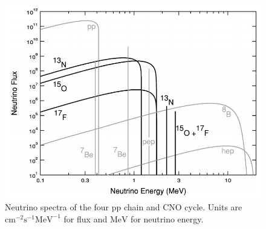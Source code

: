 \documentclass[%
 aip,
 jmp,%
 amsmath,amssymb,
 reprint,%
]{revtex4-1}
\begin{document}
\begin{figure}[!hbtp]
\centering
\includegraphics[width=\columnwidth]{assets/neutrino_spectra.png}
\caption{Neutrino spectra of the four pp chain and CNO cycle. Units are $\mathrm{cm^{-2} s^{-1} MeV^{-1}}$ for flux and $\mathrm{MeV}$ for neutrino energy.\cite{Stonehill2004}}
\label{fig:neutrino_spectra}
\end{figure}










\medskip

%

\end{document}
